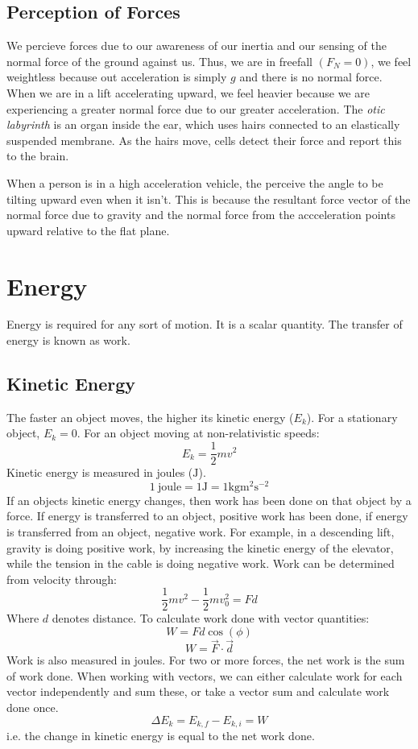 \documentclass[12pt]{report}
\begin{document}
\begin{flushleft}
\subsection*{Perception of Forces}
We percieve forces due to our awareness of our inertia and our sensing of the
normal force of the ground against us. Thus, we are in freefall \((F_N = 0)\),
we feel weightless because out acceleration is simply \(g\) and there is no 
normal force. When we are in a lift accelerating upward, we feel heavier 
because we are experiencing a greater normal force due to our greater 
acceleration. The \textit{otic labyrinth} is an organ inside the ear, 
which uses hairs connected to an elastically suspended membrane. As the hairs 
move, cells detect their force and report this to the brain.

\bigskip
When a person is in a high acceleration vehicle, the perceive the angle to be
tilting upward even when it isn't. This is because the resultant force vector 
of the normal force due to gravity and the normal force from the accceleration
points upward relative to the flat plane.

\section*{Energy}
Energy is required for any sort of motion. It is a scalar quantity. The 
transfer of energy is known as work.

\subsection*{Kinetic Energy}
The faster an object moves, the higher its kinetic energy (\(E_k\)). For a 
stationary object, \(E_k = 0\). For an object moving at non-relativistic 
speeds:
\[E_k = \frac{1}{2}mv^2\]
Kinetic energy is measured in joules (\(\mathrm{J}\)).
\[1 \:\mathrm{joule} = 1\mathrm{J} = 1\mathrm{kg}\mathrm{m}^2\mathrm{s}^{-2}\]
If an objects kinetic energy changes, then work has been done on that object by
a force. If energy is transferred to an object, positive work has been done, if
energy is transferred from an object, negative work. For example, in a 
descending lift, gravity is doing positive work, by increasing the kinetic 
energy of the elevator, while the tension in the cable is doing negative work.
Work can be determined from velocity through:
\[\frac{1}{2}mv^2 - \frac{1}{2}mv_0^2 = Fd\]
Where \(d\) denotes distance. To calculate work done with vector quantities:
\[W = Fd\cos(\phi)\]
\[W = \vec{F}\cdot\vec{d}\]
Work is also measured in joules. For two or more forces, the net work is the
sum of work done. When working with vectors, we can either calculate work for 
each vector independently and sum these, or take a vector sum and calculate 
work done once.
\[\Delta E_k = E_{k,f} - E_{k,i} = W\]
i.e. the change in kinetic energy is equal to the net work done.


\end{flushleft}
\end{document}
